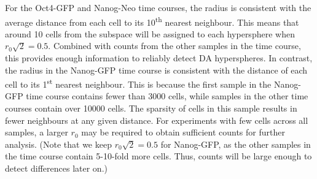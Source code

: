 \documentclass{article}
\begin{document}
%
  
For the Oct4-GFP and Nanog-Neo time courses, the radius is consistent with the average distance from each cell to its 10\textsuperscript{th} nearest neighbour.
This means that around 10 cells from the subspace will be assigned to each hypersphere when $r_0\sqrt{2}=0.5$.
Combined with counts from the other samples in the time course, this provides enough information to reliably detect DA hyperspheres.
In contrast, the radius in the Nanog-GFP time course is consistent with the distance of each cell to its 1\textsuperscript{st} nearest neighbour.
This is because the first sample in the Nanog-GFP time course contains fewer than 3000 cells, while samples in the other time courses contain over 10000 cells.
The sparsity of cells in this sample results in fewer neighbours at any given distance.
For experiments with few cells across all samples, a larger $r_0$ may be required to obtain sufficient counts for further analysis.
(Note that we keep $r_0\sqrt{2}=0.5$ for Nanog-GFP, as the other samples in the time course contain 5-10-fold more cells.
Thus, counts will be large enough to detect differences later on.)
\end{document}
